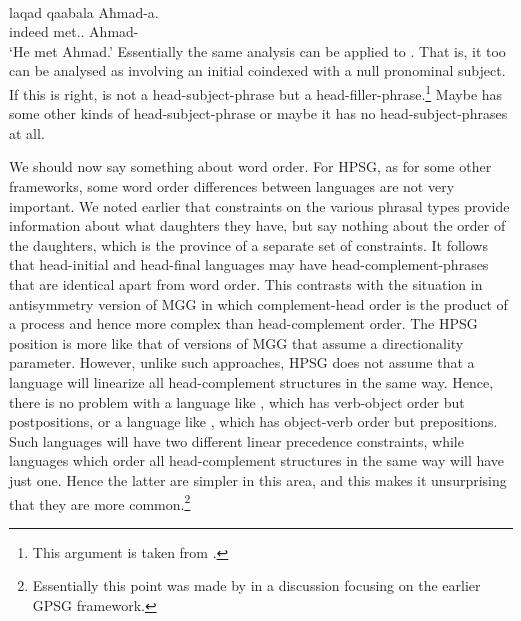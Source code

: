 \documentclass[output=paper]{langsci/langscibook}
\begin{document}
\ea\label{ex:borsley:4.29}\\
       \gll laqad    qaabala    Aħmad-a.\\
            indeed met.\Tsg.\M{} Ahmad-\Acc{}\\
    \glt    \enquote*{He met Ahmad.}
\z
%
Essentially the same analysis can be applied to . That is, it
too can be analysed as involving an initial  coindexed with a null
pronominal subject. If this is right,  is not a
head-subject-phrase but a head-filler-phrase.\footnote{This argument
is taken from \citet{AloBor2013}.} Maybe  has some other kinds of
head-subject-phrase or maybe it has no head-subject-phrases at all.

We should now say something about word order. For \gls{HPSG}, as for some other
frameworks, some word order differences between languages are not very
important. We noted earlier that constraints on the various phrasal types
provide information about what daughters they have, but say nothing about the
order of the daughters, which is the province of a separate set of constraints.
It follows that head-initial and head-final languages may have
head-complement-phrases that are identical apart from word order. This
contrasts with the situation in  antisymmetry version of
\gls{MGG} in which complement-head order is the product of a  process
and hence more complex than head-complement order. The \gls{HPSG} position is more
like that of versions of \gls{MGG} that assume a directionality parameter.
However, unlike such approaches, \gls{HPSG} does not assume that a language will
linearize all head-complement structures in the same way. Hence, there is no
problem with a language like , which has verb-object order but
postpositions, or a language like , which has object-verb order but
prepositions. Such languages will have two different linear precedence
constraints, while languages which order all head-complement structures in the
same way will have just one. Hence the latter are simpler in this area, and
this makes it unsurprising that they are more common.\footnote{Essentially this
point was made by \citet{FodCra1990} in a discussion focusing on the
earlier \gls{GPSG} framework.}
\end{document}
